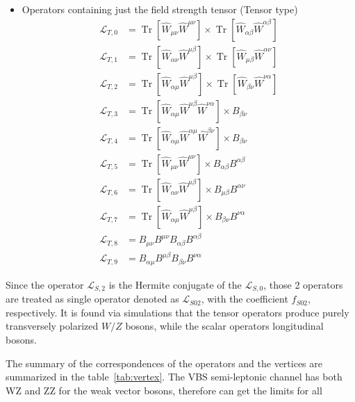 \begin{itemize}
\item Operators containing just the field strength tensor (Tensor type)
\begin{equation}
\begin{aligned}
\mathcal{L}_{T, 0} &=\operatorname{Tr}\left[\hat{W}_{\mu \nu} \hat{W}^{\mu \nu}\right] \times \operatorname{Tr}\left[\hat{W}_{\alpha \beta} \hat{W}^{\alpha \beta}\right] \\
\mathcal{L}_{T, 1} &=\operatorname{Tr}\left[\hat{W}_{\alpha \nu} \hat{W}^{\mu \beta}\right] \times \operatorname{Tr}\left[\hat{W}_{\mu \beta} \hat{W}^{\alpha \nu}\right] \\
\mathcal{L}_{T, 2} &=\operatorname{Tr}\left[\hat{W}_{\alpha \mu} \hat{W}^{\mu \beta}\right] \times \operatorname{Tr}\left[\hat{W}_{\beta \nu} \hat{W}^{\nu \alpha}\right] \\
\mathcal{L}_{T, 3} &=\operatorname{Tr}\left[\hat{W}_{\alpha \mu} \hat{W}^{\mu \beta} \hat{W}^{\nu \alpha}\right] \times B_{\beta \nu} \\
\mathcal{L}_{T, 4} &=\operatorname{Tr}\left[\hat{W}_{\alpha \mu} \hat{W}^{\alpha \mu} \hat{W}^{\beta \nu}\right] \times B_{\beta \nu} \\
\mathcal{L}_{T, 5} &=\operatorname{Tr}\left[\hat{W}_{\mu \nu} \hat{W}^{\mu \nu}\right] \times B_{\alpha \beta} B^{\alpha \beta} \\
\mathcal{L}_{T, 6} &=\operatorname{Tr}\left[\hat{W}_{\alpha \nu} \hat{W}^{\mu \beta}\right] \times B_{\mu \beta} B^{\alpha \nu} \\
\mathcal{L}_{T, 7} &=\operatorname{Tr}\left[\hat{W}_{\alpha \mu} \hat{W}^{\mu \beta}\right] \times B_{\beta \nu} B^{\nu \alpha} \\
\mathcal{L}_{T, 8} &=B_{\mu \nu} B^{\mu \nu} B_{\alpha \beta} B^{\alpha \beta} \\
\mathcal{L}_{T, 9} &=B_{\alpha \mu} B^{\mu \beta} B_{\beta \nu} B^{\nu \alpha}
\end{aligned}
\end{equation}
\end{itemize}

Since the operator $\mathcal{L}_{S, 2}$ is the Hermite conjugate of the $\mathcal{L}_{S, 0}$, those 2 operators are treated as single operator denoted as $\mathcal{L}_{S02}$, with the coefficient $f_{S02}$, respectively. It is found via simulations that the tensor operators produce purely transversely polarized $W/Z$ bosons, while the scalar operators longitudinal bosons.

The summary of the correspondences of the operators and the vertices are summarized in the table~\ref{tab:vertex}. The VBS semi-leptonic channel has both WZ and ZZ for the weak vector bosons, therefore can get the limits for all 

